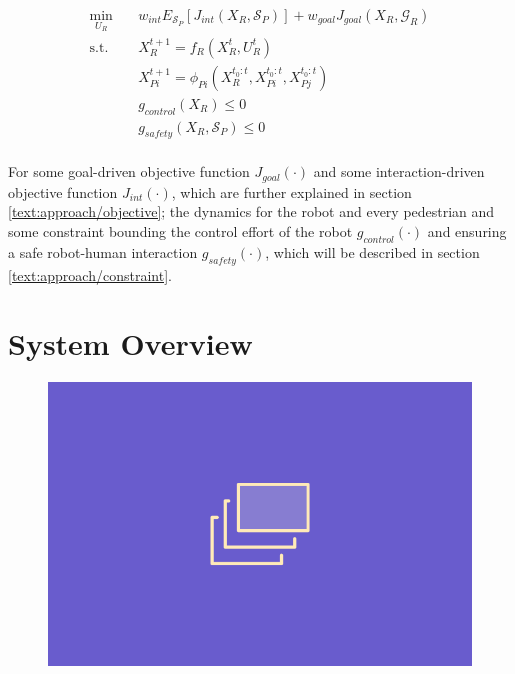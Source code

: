 \begin{align}
\min_{U_R} \quad & w_{int} E_{\mathcal{S}_P}[J_{int}(X_R, \mathcal{S}_P)] + w_{goal} J_{goal}(X_R, \mathcal{G}_R) \\
\textrm{s.t. } \quad & X_R^{t+1} = f_R(X_R^t, U_R^t) \\
& X_{Pi}^{t+1} = \phi_{Pi}(X_R^{t_0:t}, X_{Pi}^{t_0:t}, X_{Pj}^{t_0:t}) \\
& g_{control}(X_R) \leq 0 \\
& g_{safety}(X_R, \mathcal{S}_P) \leq 0 \\
\label{eq:formulation}
\end{align} 

For some goal-driven objective function $J_{goal}(\cdot)$ and some interaction-driven objective function $J_{int}(\cdot)$, which are further explained in section \ref{text:approach/objective}; the dynamics for the robot and every pedestrian and some constraint bounding the control effort of the robot $g_{control}(\cdot)$ and ensuring a safe robot-human interaction $g_{safety}(\cdot)$, which will be described in section \ref{text:approach/constraint}.


\section{System Overview}
\label{text:approach/overview}

\begin{figure}[!ht]
\begin{center}
\includegraphics[width=\imgwidth]{images/placeholder.png}
\label{img:information_flow}
\end{center}
\end{figure}

